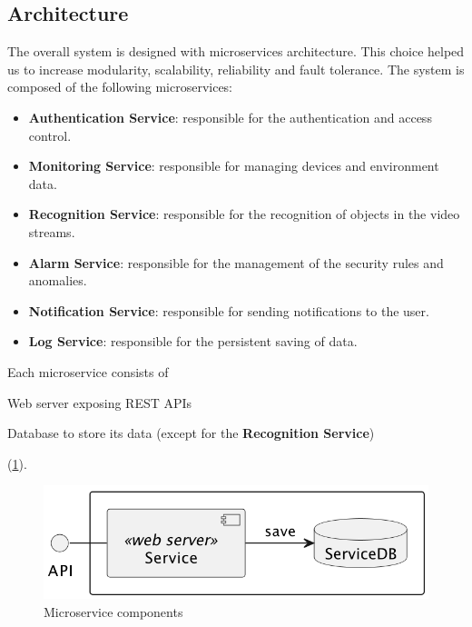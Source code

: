 \documentclass{scrartcl}
\begin{document}
    \subsection{Architecture}

    The overall system is designed with microservices architecture.
    This choice helped us to increase modularity, scalability, reliability and fault tolerance.
    The system is composed of the following microservices:

    \begin{itemize}
        \item \textbf{Authentication Service}: responsible for the authentication and access control.
        \item \textbf{Monitoring Service}: responsible for managing devices and environment data.
        \item \textbf{Recognition Service}: responsible for the recognition of objects in the video streams.
        \item \textbf{Alarm Service}: responsible for the management of the security rules and anomalies.
        \item \textbf{Notification Service}: responsible for sending notifications to the user.
        \item \textbf{Log Service}: responsible for the persistent saving of data.
    \end{itemize}

    Each microservice consists of
    \begin{enumerate*}
        \item Web server exposing REST APIs
        \item Database to store its data (except for the \textbf{Recognition Service})
    \end{enumerate*}
    (\cref{fig:microservice}).

    \begin{figure}
        \centering
        \includegraphics[scale=0.6]{img/microservice}
        \caption{Microservice components}
        \label{fig:microservice}
    \end{figure}
\end{document}
